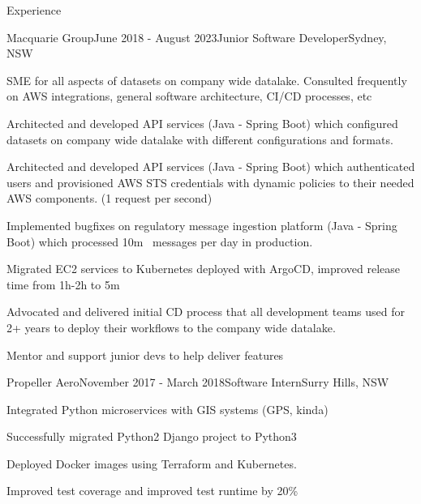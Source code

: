 \documentclass{resume} %
\begin{document}

\begin{rSection}{Experience}
    \begin{rSubsection}{Macquarie Group}{June 2018 - August 2023}{Junior Software Developer}{Sydney, NSW}
    \item SME for all aspects of datasets on company wide datalake. Consulted frequently on AWS integrations, general software architecture, CI/CD processes, etc
    \item Architected and developed API services (Java - Spring Boot) which configured datasets on company wide datalake with different configurations and formats.
    \item Architected and developed API services (Java - Spring Boot) which authenticated users and provisioned AWS STS credentials with dynamic policies to their needed AWS components. (1 request per second)
    \item Implemented bugfixes on regulatory message ingestion platform (Java - Spring Boot) which processed 10m~ messages per day in production.
    \item Migrated EC2 services to Kubernetes deployed with ArgoCD, improved release time from 1h-2h to 5m~
    \item Advocated and delivered initial CD process that all development teams used for 2+ years to deploy their workflows to the company wide datalake.
    \item Mentor and support junior devs to help deliver features
    \end{rSubsection}

    \begin{rSubsection}{Propeller Aero}{November 2017 - March 2018}{Software Intern}{Surry Hills, NSW}
    \item Integrated Python microservices with GIS systems (GPS, kinda)
    \item Successfully migrated Python2 Django project to Python3
    \item Deployed Docker images using Terraform and Kubernetes.
    \item Improved test coverage and improved test runtime by 20\%
    \end{rSubsection}
    
    \end{rSection}
\end{document}
